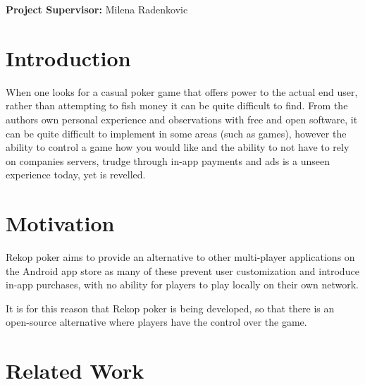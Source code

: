 \documentclass[11pt]{article}
\begin{document}
\vfill

\begin{center}
	\textbf{Project Supervisor:} Milena Radenkovic
\end{center}

\hspace{0pt}

\pagebreak


\newcommand{\entry}[1]{
	\textbf{#1} - 
}

\newcommand{\TODO}[1]{
	\textbf{{\Large \emph{#1}}}
}



\tableofcontents



\newpage











\section{Introduction}

When one looks for a casual poker game that offers power to the actual end user, rather than attempting to fish money it can be quite difficult to find. From the authors own personal experience and observations with free and open software, it can be quite difficult to implement in some areas (such as games), however the ability to control a game how you would like and the ability to not have to rely on companies servers, trudge through in-app payments and ads is a unseen experience today, yet  is revelled.





\section{Motivation}
Rekop poker aims to provide an alternative to other multi-player applications on the Android app store as many of these prevent user customization and introduce in-app purchases, with no ability for players to play locally on their own network. 

It is for this reason that Rekop poker is being developed, so that there is an open-source alternative where players have the control over the game. 



\section{Related Work}
\end{document}
